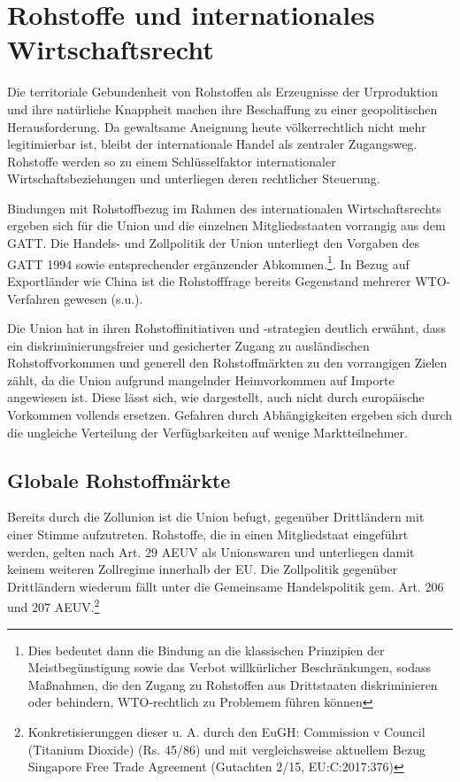 \documentclass[12pt,a4paper,oneside]{book} %
\begin{document}
\section{Rohstoffe und internationales Wirtschaftsrecht}
Die territoriale Gebundenheit von Rohstoffen als Erzeugnisse der Urproduktion und ihre natürliche Knappheit machen ihre Beschaffung zu einer geopolitischen Herausforderung. Da gewaltsame Aneignung heute völkerrechtlich nicht mehr legitimierbar ist, bleibt der internationale Handel als zentraler Zugangsweg. Rohstoffe werden so zu einem Schlüsselfaktor internationaler Wirtschaftsbeziehungen und unterliegen deren rechtlicher Steuerung.\autocite{Terhechte, Rohstoffverwaltung, Rn. 5}

Bindungen mit Rohstoffbezug im Rahmen des internationalen Wirtschaftsrechts ergeben sich für die Union und die einzelnen Mitgliedsstaaten vorrangig aus dem GATT. Die Handels- und Zollpolitik der Union unterliegt den Vorgaben des GATT 1994 sowie entsprechender ergänzender Abkommen.\footnote{Dies bedeutet dann die Bindung an die klassischen Prinzipien der Meistbegünstigung sowie das Verbot willkürlicher Beschränkungen, sodass Maßnahmen, die den Zugang zu Rohstoffen aus Drittstaaten diskriminieren oder behindern, WTO-rechtlich zu Problemem führen können}. In Bezug auf Exportländer wie China ist die Rohstofffrage bereits Gegenstand mehrerer WTO-Verfahren gewesen (s.u.).

Die Union hat in ihren Rohstoffinitiativen und -strategien deutlich erwähnt, dass ein diskriminierungsfreier und gesicherter Zugang zu ausländischen Rohstoffvorkommen und generell den Rohstoffmärkten zu den vorrangigen Zielen zählt, da die Union aufgrund mangelnder Heimvorkommen auf Importe angewiesen ist. Diese lässt sich, wie dargestellt, auch nicht durch europäische Vorkommen vollends ersetzen. Gefahren durch Abhängigkeiten ergeben sich durch die ungleiche Verteilung der Verfügbarkeiten auf wenige Marktteilnehmer.

\subsection{Globale Rohstoffmärkte}

Bereits durch die Zollunion ist die Union befugt, gegenüber Drittländern mit einer Stimme aufzutreten. Rohstoffe, die in einen Mitgliedstaat eingeführt werden, gelten nach Art. 29 AEUV als Unionswaren und unterliegen damit keinem weiteren Zollregime innerhalb der EU. Die Zollpolitik gegenüber Drittländern wiederum fällt unter die Gemeinsame Handelspolitik gem. Art. 206 und 207 AEUV.\footnote{Konkretisierunggen dieser u. A. durch den EuGH: Commission v Council (Titanium Dioxide) (Rs. 45/86) und mit vergleichsweise aktuellem Bezug Singapore Free Trade Agreement (Gutachten 2/15, EU:C:2017:376)}
\end{document}
